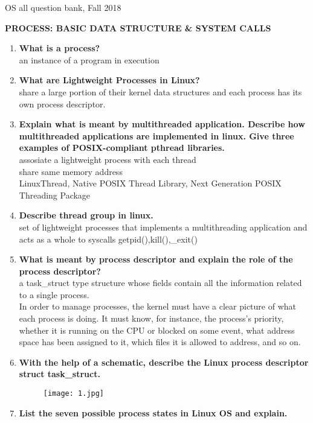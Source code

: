 \documentclass[a4paper,12pt]{article}
\begin{document}
\begin{center}
{\scriptsize OS all question bank, Fall 2018}
\end{center}

\vfill\break
\begin{flushleft}
\textbf{PROCESS: BASIC DATA STRUCTURE \& SYSTEM CALLS}
\begin{enumerate}
\item \textbf{What is a process?}\\
{\color{red}an instance of a program in execution}
\item \textbf{What are Lightweight Processes in Linux?\\}
{\color{red}share a large portion of their kernel data structures and each process has its own process
descriptor.}
\item \textbf{ Explain what is meant by multithreaded application. Describe how multithreaded applications are implemented in linux. Give three examples of POSIX-compliant pthread libraries.\\}
{\color{red}assosiate a lightweight process with each thread\\share same memory address\\ LinuxThread, Native POSIX Thread Library, Next Generation POSIX Threading Package }
\item \textbf{ Describe thread group in linux.}\\
{\color{red}set of lightweight processes that implements a multithreading application and acts as a whole to syscalls getpid(),kill(),\_exit()}
\item \textbf{ What is meant by process descriptor and explain the role of the process descriptor?}\\
{\color{red}a task\_struct type
structure whose fields contain all the information related to a single process.\\
In order to manage processes, the kernel must have a clear picture of what each process is
doing. It must know, for instance, the process's priority, whether it is running on the CPU or
blocked on some event, what address space has been assigned to it, which files it is allowed to
address, and so on.}
\item \textbf{ With the help of a schematic, describe the Linux process descriptor struct task\_struct.}
\begin{figure}[H]
 \centering
  \texttt{[image: 1.jpg]}
  \label{fig:1}
\end{figure}
\item \textbf{ List the seven possible process states in Linux OS and explain.\\}

\end{enumerate}
\end{flushleft}
\end{document}

